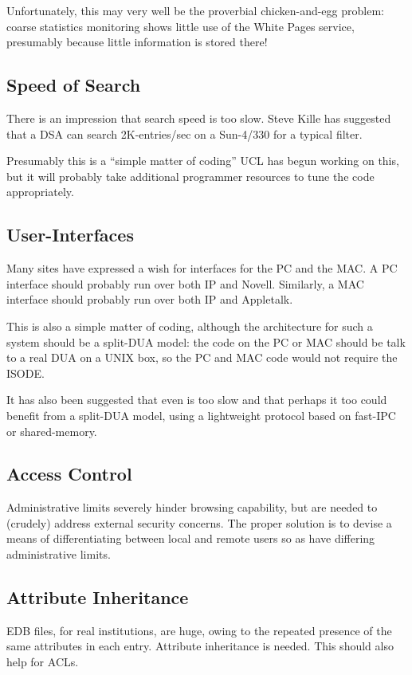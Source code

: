 Unfortunately,
this may very well be the proverbial chicken-and-egg problem:
coarse statistics monitoring shows little use of the White Pages service,
presumably because little information is stored there!

\subsection	{Speed of Search}
There is an impression that search speed is too slow.  Steve Kille
has suggested that a DSA can search 2K-entries/sec on a Sun-4/330 for a
typical filter.

Presumably this is a ``simple matter of coding''
UCL has begun working on this,
but it will probably take additional programmer resources to tune the code
appropriately.

\subsection	{User-Interfaces}
Many sites have expressed a wish for interfaces for the PC and the MAC.
A PC interface should probably run over both IP and Novell.
Similarly,
a MAC interface should probably run over both IP and Appletalk.

This is also a simple matter of coding,
although the architecture for such a system should be a split-DUA model:
the code on the PC or MAC should be talk to a real DUA on a UNIX box,
so the PC and MAC code would not require the ISODE.

It has also been suggested that even  is too slow and that perhaps
it too could benefit from a split-DUA model,
using a lightweight protocol based on fast-IPC or shared-memory.

\subsection	{Access Control}
Administrative limits severely hinder browsing capability,
but are needed to (crudely) address external security concerns.
The proper solution is to devise a means of differentiating between local and
remote users so as have differing administrative limits.

\subsection	{Attribute Inheritance}
EDB files, for real institutions, are huge, owing to the repeated presence of
the same attributes in each entry.
Attribute inheritance is needed.
This should also help for ACLs.

